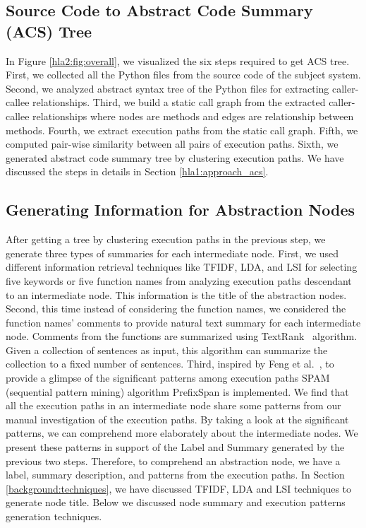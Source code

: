 \subsection{Source Code to Abstract Code Summary (ACS) Tree}
\label{hla2:six_step}
In Figure \ref{hla2:fig:overall}, we visualized the six steps required to get ACS tree. First, we collected all the Python files from the source code of the subject system. Second, we analyzed abstract syntax tree of the Python files for extracting caller-callee relationships. Third, we build a static call graph from the extracted caller-callee relationships where nodes are methods and edges are relationship between methods. Fourth, we extract execution paths from the static call graph. Fifth, we computed pair-wise similarity between all pairs of execution paths. Sixth, we generated abstract code summary tree by clustering execution paths. We have discussed the steps in details in Section \ref{hla1:approach_acs}.


\subsection{Generating Information for Abstraction Nodes}
\label{hla2:node_information}
After getting a tree by clustering execution paths in the previous step,  
we generate three types of summaries for each intermediate node. First, we used different information retrieval techniques like TFIDF, LDA, and LSI for selecting five keywords or five function names from analyzing execution paths descendant to an intermediate node. This information is the title of the abstraction nodes. Second, this time instead of considering the function names, we considered the function names' comments to provide natural text summary for each intermediate node. Comments from the functions are summarized using  TextRank~\cite{barrios2016variationsTextRankSummarization} algorithm. Given a collection of sentences as input, this algorithm can summarize the collection to a fixed number of sentences. Third, inspired by Feng et al.~\cite{feng2018hierarchicalExecutionComprehension}, to provide a glimpse of the significant patterns among execution paths SPAM (sequential pattern mining) algorithm PrefixSpan \cite{han2001prefixspanSequentialPatterns} is implemented. We find that all the execution paths in an intermediate node share some patterns from our manual investigation of the execution paths. By taking a look at the significant patterns, we can comprehend more elaborately about the intermediate nodes. We present these patterns in support of the Label and Summary generated by the previous two steps. Therefore, to comprehend an abstraction node, we have a label, summary description, and patterns from the execution paths. In Section \ref{background:techniques}, we have discussed TFIDF, LDA and LSI techniques to generate node title. Below we discussed node summary and execution patterns generation techniques.


